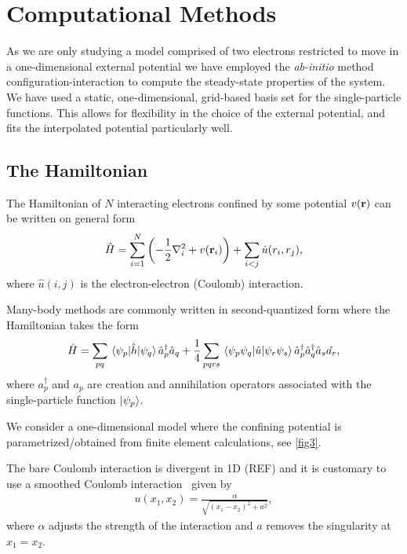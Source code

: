 \documentclass[twocolumn,superscriptaddress,unsortedaddress,
 amsmath,amssymb,
 aps,
]{revtex4-2}
\begin{document}
\section{Computational Methods} %
    As we are only studying a model comprised of two electrons restricted to move in a
    one-dimensional external potential we have employed the
    \emph{ab-initio} method configuration-interaction to compute the steady-state
    properties of the system.
    We have used a static, one-dimensional, grid-based basis set for the single-particle
    functions.
    This allows for flexibility in the choice of the external potential, and fits the
    interpolated potential particularly well.
    
    \subsection{The Hamiltonian}
    The Hamiltonian of $N$ interacting electrons confined by some potential $v(\vb{r})$ can be written on general form 
    \begin{equation}
        \hat{H} = \sum_{i=1}^N \left(-\frac{1}{2}\nabla_i^2 + v(\vb{r}_i) \right) + \sum_{i < j} \hat{u}(r_i, r_j),
    \end{equation}
    where $\hat{u}(i,j)$ is the electron-electron (Coulomb) interaction. 
    
    Many-body methods are commonly written in second-quantized form where the Hamiltonian takes the form 
    \begin{equation}
        \hat{H} = \sum_{pq} \mel{\psi_p}{\hat{h}}{\psi_q}\hat{a}_p^\dagger \hat{a}_q + \frac{1}{4}\sum_{pqrs} \mel{\psi_p \psi_q}{\hat{u}}{\psi_r \psi_s} \hat{a}_p^\dagger \hat{a}_q^\dagger \hat{a}_s \hat{a_r},
    \end{equation}
    where $a_p^\dagger$ and $a_p$ are creation and annihilation operators associated with the single-particle function $\ket{\psi_p}$.
    
    We consider a one-dimensional model where the confining potential is parametrized/obtained from finite element calculations, see \ref{fig3}. 
    
    The bare Coulomb interaction is divergent in 1D (REF) and it is customary to use a smoothed Coulomb interaction~\cite{su-coulomb} given by 
    \begin{align}
        u(x_1, x_2) = \frac{\alpha}{\sqrt{(x_1 - x_2)^2 + a^2}},
    \end{align}
    where $\alpha$ adjusts the strength of the interaction and $a$ removes
    the singularity at $x_1 = x_2$.
    
\end{document}
